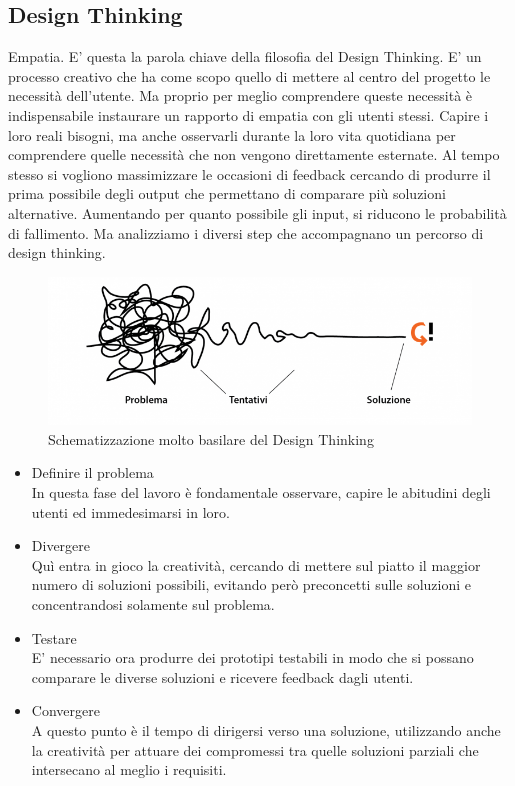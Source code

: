 \subsection{Design Thinking}
Empatia. E' questa la parola chiave della filosofia del Design Thinking. E' un processo creativo che ha come scopo quello di mettere al centro del progetto le necessità dell'utente. Ma proprio per meglio comprendere queste necessità è indispensabile instaurare un rapporto di empatia con gli utenti stessi. Capire i loro reali bisogni, ma anche osservarli durante la loro vita quotidiana per comprendere quelle necessità che non vengono direttamente esternate. Al tempo stesso si vogliono massimizzare le occasioni di feedback cercando di produrre il prima possibile degli output che permettano di comparare più soluzioni alternative. Aumentando per quanto possibile gli input, si riducono le probabilità di fallimento. Ma analizziamo i diversi step che accompagnano un percorso di design thinking.
\begin{figure}[h!]
	\centering
	\includegraphics[width=\textwidth,keepaspectratio=true]{capitoli/imgs/Design-Thinking.png}
	\caption{Schematizzazione molto basilare del Design Thinking}
\end{figure}
\begin{itemize}
	\item Definire il problema \\
	In questa fase del lavoro è fondamentale osservare, capire le abitudini degli utenti ed immedesimarsi in loro.
	\item Divergere \\
	Quì entra in gioco la creatività, cercando di mettere sul piatto il maggior numero di soluzioni possibili, evitando però preconcetti sulle soluzioni e concentrandosi solamente sul problema.
	\item Testare \\
	E' necessario ora produrre dei prototipi testabili in modo che si possano comparare le diverse soluzioni e ricevere feedback dagli utenti.
	\item Convergere \\
	A questo punto è il tempo di dirigersi verso una soluzione, utilizzando anche la creatività per attuare dei compromessi tra quelle soluzioni parziali che intersecano al meglio i requisiti.
\end{itemize}


